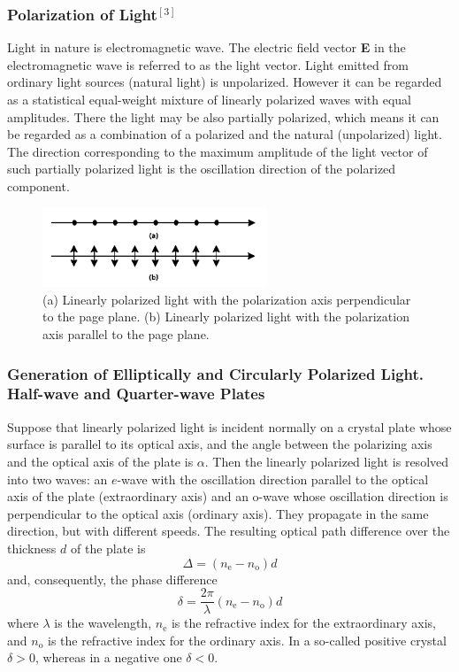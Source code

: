 \documentclass[a4paper]{article}
\begin{document}
\subsubsection{Polarization of Light$^{[3]}$}

\par Light in nature is electromagnetic wave. The electric field vector \textbf{E} in the electromagnetic wave is referred to as the light vector.
Light emitted from ordinary light sources (natural light) is unpolarized. However it can be regarded as a statistical equal-weight mixture of linearly
polarized waves with equal amplitudes. There the light may be also partially polarized, which means it can be regarded as a combination of a polarized
and the natural (unpolarized) light. The direction corresponding to the maximum amplitude of the light vector of such partially polarized light is the
oscillation direction of the polarized component.

\begin{figure}[!htbp]
	\centering
	\includegraphics[width=0.6\textwidth]{polarization of light.png}
	\caption{(a) Linearly polarized light with the polarization axis perpendicular to the page
		plane. (b) Linearly polarized light with the polarization axis parallel to the page plane.}
	\label{fig::polarization of light}
\end{figure}


\subsubsection{Generation of Elliptically and Circularly Polarized Light. Half-wave and Quarter-wave Plates}
\par Suppose that linearly polarized light is incident normally on a crystal plate whose surface is parallel to its optical axis, and the angle between the polarizing
axis and the optical axis of the plate is $\alpha$. Then the linearly polarized light is resolved into two waves: an $e$-wave with the oscillation direction parallel
to the optical axis of the plate (extraordinary axis) and an o-wave whose oscillation direction is perpendicular to the optical axis (ordinary axis). They propagate in
the same direction, but with different speeds. The resulting optical path difference over the thickness $d$ of the plate is
\begin{equation}
	\Delta=\left(n_{\mathrm{e}}-n_{\mathrm{o}}\right) d
\end{equation}
and, consequently, the phase difference
\begin{equation}
	\delta=\frac{2 \pi}{\lambda}\left(n_{\mathrm{e}}-n_{\mathrm{o}}\right) d
\end{equation}
where $\lambda$ is the wavelength, $n_{\mathrm{e}}$ is the refractive index for the extraordinary axis, and $n_{\mathrm{o}}$ is the refractive index for the ordinary axis.
In a so-called positive crystal $\delta>0$, whereas in a negative one $\delta<0$.
\end{document}
